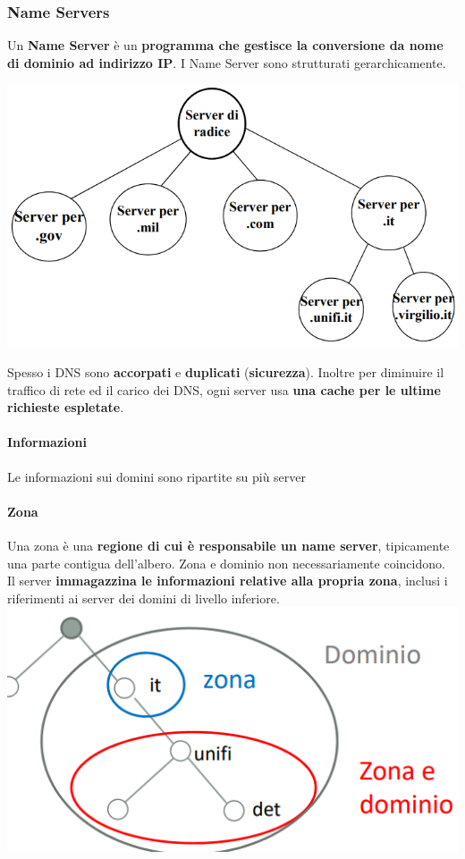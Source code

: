 \documentclass[10pt]{article}
\begin{document}
\subsubsection{Name Servers}
Un \textbf{Name Server} è un \textbf{programma che gestisce la conversione da nome di dominio ad indirizzo IP}. I Name Server sono strutturati gerarchicamente.
\begin{center}
\includegraphics[scale=0.75]{strutturanameservers.png}
\end{center}
Spesso i DNS sono \textbf{accorpati} e \textbf{duplicati} (\textbf{sicurezza}). Inoltre per diminuire il traffico di rete ed il carico dei DNS, ogni server usa \textbf{una cache per le ultime richieste espletate}.
\begin{multicols}{2}
\paragraph{Informazioni} Le informazioni sui domini sono ripartite su più server
\paragraph{Zona} Una zona è una \textbf{regione di cui è responsabile un name server}, tipicamente una parte contigua dell'albero. Zona e dominio non necessariamente coincidono.\\
Il server \textbf{immagazzina le informazioni relative alla propria zona}, inclusi i riferimenti ai server dei domini di livello inferiore.
\includegraphics[scale=0.7]{zonadominio.png}
\end{multicols}
\pagebreak
\end{document}
